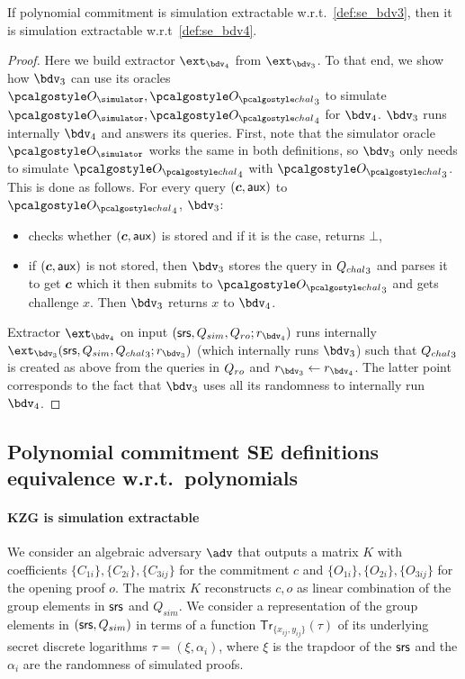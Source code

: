 \documentclass[runningheads,11pt]{llncs}
\let\spvec\vec
\let\vec\accentvec
\let\spvec\vec
\let\vec\spvec
\def\vec#1{\mathchoice{\mbox{\boldmath$\displaystyle#1$}}
  {\mbox{\boldmath$\textstyle#1$}} {\mbox{\boldmath$\scriptstyle#1$}}
  {\mbox{\boldmath$\scriptscriptstyle#1$}}}
\begin{document}
\begin{lemma}[]
  If polynomial commitment is simulation extractable w.r.t.~\cref{def:se_bdv3}, then
  it is simulation extractable w.r.t~\cref{def:se_bdv4}.
\end{lemma}
\begin{proof}
  Here we build extractor $\ext_{\bdv_4}$ from $\ext_{\bdv_3}$. To that end, we show
  how $\bdv_3$ can use its oracles $\oracles, \oraclec_3$ to simulate
  $\oracles, \oraclec_4$ for $\bdv_4$. $\bdv_3$ runs internally $\bdv_4$ and answers
  its queries. First, note that the simulator oracle $\oracles$ works the same in
  both definitions, so $\bdv_3$ only needs to simulate $\oraclec_4$ with
  $\oraclec_3$. This is done as follows. For every query $(\vec{c}, \aux)$ to
  $\oraclec_4$, $\bdv_3$:
  \begin{itemize}
  \item checks whether $(\vec{c}, \aux)$ is stored and if it is the case, returns
    $\bot$,
  \item if $(\vec{c}, \aux)$ is not stored, then $\bdv_3$ stores the query in
    ${Q_{chal}}_3$ and parses it to get $\vec{c}$ which it then submits to $\oraclec_3$
    and gets challenge $x$. Then $\bdv_3$ returns $x$ to $\bdv_4$.
  \end{itemize}

  Extractor $\ext_{\bdv_4}$ on input $(\srs, \Qsim, \Qh; r_{\bdv_4})$ runs internally
  $\ext_{\bdv_3} (\srs, \Qsim, \Qchal_3; r_{\bdv_3})$ (which internally runs
  $\bdv_3$) such that ${Q_{chal}}_3$ is created as above from the queries in $Q_{ro}$ and
  $r_{\bdv_3} \gets r_{\bdv_4}$. The latter point corresponds to the fact that
  $\bdv_3$ uses all its randomness to internally run $\bdv_4$.
\end{proof}
\fi

\subsection{Polynomial commitment SE definitions equivalence w.r.t.~polynomials}

\paragraph{KZG is simulation extractable}

We consider an algebraic adversary $\adv$ that outputs a matrix $K$ with coefficients
$\{C_{{1i}}\},\{C_{{2i}}\}, \{C_{{3ij}}\}$ for the commitment $c$ and
$\{O_{{1i}}\},\{O_{{2i}}\}, \{O_{{3ij}}\}$ for the opening proof $o$. The matrix $K$
reconstructs $c,o$ as linear combination of the group elements in $\mathsf{srs}$ and
$Q_{sim}$. We consider a representation of the group elements in $(\mathsf{srs}, Q_{{sim}})$
in terms of a function $\mathsf{Tr}_{\{x_{ij},y_{ij}\}}(\tau)$ of its underlying
secret discrete logarithms $\tau= (\xi, \alpha_{i})$, where $\xi$ is the trapdoor of
the $\mathsf{srs}$ and the $\alpha_{i}$ are the randomness of simulated proofs.
\end{document}
